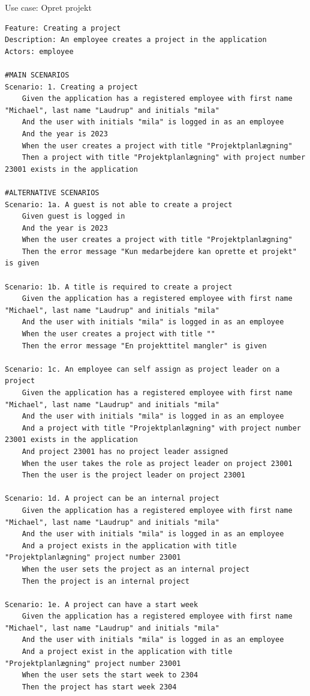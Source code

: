 \begin{listing}[H]
    \centering
    \caption{Use case: Opret projekt}\label{lst:usecase_create_project}
    \begin{verbatim}  
Feature: Creating a project
Description: An employee creates a project in the application
Actors: employee

#MAIN SCENARIOS
Scenario: 1. Creating a project
    Given the application has a registered employee with first name "Michael", last name "Laudrup" and initials "mila"
    And the user with initials "mila" is logged in as an employee
    And the year is 2023
    When the user creates a project with title "Projektplanlægning" 
    Then a project with title "Projektplanlægning" with project number 23001 exists in the application

#ALTERNATIVE SCENARIOS
Scenario: 1a. A guest is not able to create a project
    Given guest is logged in
    And the year is 2023
    When the user creates a project with title "Projektplanlægning" 
    Then the error message "Kun medarbejdere kan oprette et projekt" is given

Scenario: 1b. A title is required to create a project
    Given the application has a registered employee with first name "Michael", last name "Laudrup" and initials "mila"
    And the user with initials "mila" is logged in as an employee
    When the user creates a project with title ""
    Then the error message "En projekttitel mangler" is given

Scenario: 1c. An employee can self assign as project leader on a project
    Given the application has a registered employee with first name "Michael", last name "Laudrup" and initials "mila"
    And the user with initials "mila" is logged in as an employee
    And a project with title "Projektplanlægning" with project number 23001 exists in the application
    And project 23001 has no project leader assigned
    When the user takes the role as project leader on project 23001
    Then the user is the project leader on project 23001

Scenario: 1d. A project can be an internal project
    Given the application has a registered employee with first name "Michael", last name "Laudrup" and initials "mila"
    And the user with initials "mila" is logged in as an employee
    And a project exists in the application with title "Projektplanlægning" project number 23001
    When the user sets the project as an internal project
    Then the project is an internal project

Scenario: 1e. A project can have a start week
    Given the application has a registered employee with first name "Michael", last name "Laudrup" and initials "mila"
    And the user with initials "mila" is logged in as an employee
    And a project exist in the application with title "Projektplanlægning" project number 23001
    When the user sets the start week to 2304
    Then the project has start week 2304
    \end{verbatim}
\end{listing}
